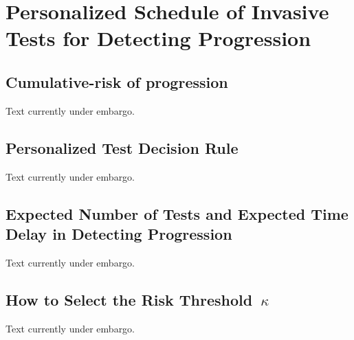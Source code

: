 \section{Personalized Schedule of Invasive Tests for Detecting Progression} 
\label{c4:sec:schedule}

\subsection{Cumulative-risk of progression} 
\label{c4:subsec:cum_risk}
Text currently under embargo.

\subsection{Personalized Test Decision Rule} 
\label{c4:subsec:pers_schedule}
Text currently under embargo.

\subsection{Expected Number of Tests and Expected Time Delay in Detecting Progression}
\label{c4:subsec:exp_delay_estimation}
Text currently under embargo.

\subsection{How to Select the Risk Threshold~$\kappa$}
\label{c4:subsec:kappa_selection}
Text currently under embargo.